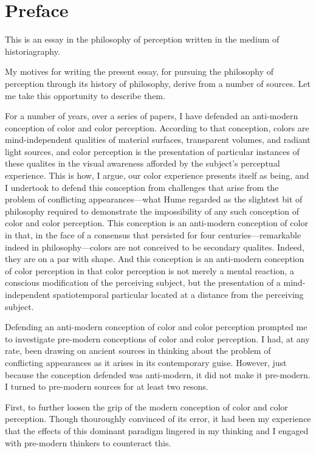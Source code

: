 \chapter*{Preface} %
\label{cha:preface}


This is an essay in the philosophy of perception written in the medium of historiagraphy. 

My motives for writing the present essay, for pursuing the philosophy of perception through its history of philosophy, derive from a number of sources. Let me take this opportunity to describe them.

For a number of years, over a series of papers, I have defended an anti-modern conception of color and color perception. According to that conception, colors are mind-independent qualities of material surfaces, transparent volumes, and radiant light sources, and color perception is the presentation of particular instances of these qualites in the visual awareness afforded by the subject's perceptual experience. This is how, I argue, our color experience presents itself as being, and I undertook to defend this conception from challenges that arise from the problem of conflicting appearances---what Hume regarded as the slightest bit of philosophy required to demonstrate the impossibility of any such conception of color and color perception. This conception is an anti-modern conception of color in that, in the face of a consensus that persisted for four centuries---remarkable indeed in philosophy---colors are not conceived to be secondary qualites. Indeed, they are on a par with shape. And this conception is an anti-modern conception of color perception in that color perception is not merely a mental reaction, a conscious modification of the perceiving subject, but the presentation of a mind-independent spatiotemporal particular located at a distance from the perceiving subject. 

Defending an anti-modern conception of color and color perception prompted me to investigate pre-modern conceptions of color and color perception. I had, at any rate, been drawing on ancient sources in thinking about the problem of conflicting appearances as it arises in its contemporary guise. However, just because the conception defended was anti-modern, it did not make it pre-modern. I turned to pre-modern sources for at least two resons. 

First, to further loosen the grip of the modern conception of color and color perception. Though thouroughly convinced of its error, it had been my experience that the effects of this dominant paradigm lingered in my thinking and I engaged with pre-modern thinkers to counteract this. 

